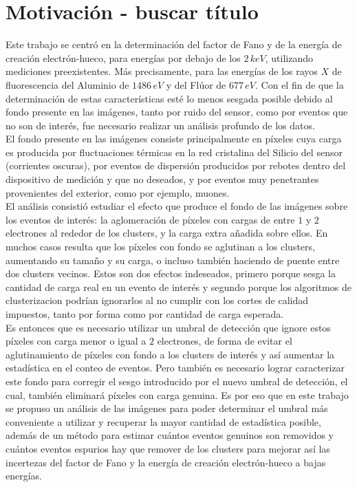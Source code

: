 \section{Motivación - buscar título}
\noindent Este trabajo se centró en la determinación del factor de Fano y de la energía de creación electrón-hueco, para energías por debajo de los $2\,\si{keV}$, utilizando mediciones preexistentes. Más precisamente, para las energías de los rayos $X$ de fluorescencia del Aluminio de $1486\,\si{eV}$ y del Flúor de $677\,\si{eV}$. Con el fin de que la determinación de estas características esté lo menos sesgada posible debido al fondo presente en las imágenes, tanto por ruido del sensor, como por eventos que no son de interés, fue necesario realizar un análisis profundo de los datos.\\
\indent El fondo presente en las imágenes consiste principalmente en píxeles cuya carga es producida por fluctuaciones térmicas en la red cristalina del Silicio del sensor (corrientes oscuras), por eventos de dispersión producidos por rebotes dentro del dispositivo de medición y que no deseados, y por eventos muy penetrantes provenientes del exterior, como por ejemplo, muones.\\
\indent El análisis consistió estudiar el efecto que produce el fondo de las imágenes sobre los eventos de interés: la aglomeración de píxeles con cargas de entre $1$ y $2$ electrones al rededor de los clusters, y la carga extra añadida sobre ellos. En muchos casos resulta que los píxeles con fondo se aglutinan a los clusters, aumentando su tamaño y su carga, o incluso también haciendo de puente entre dos clusters vecinos. Estos son dos efectos indeseados, primero porque sesga la cantidad de carga real en un evento de interés y segundo porque los algoritmos de clusterizacion podrían ignorarlos al no cumplir con los cortes de calidad impuestos, tanto por forma como por cantidad de carga esperada.\\
\indent Es entonces que es necesario utilizar un umbral de detección que ignore estos píxeles con carga menor o igual a $2$ electrones, de forma de evitar el aglutinamiento de píxeles con fondo a los clusters de interés y así aumentar la estadística en el conteo de eventos. Pero también es necesario lograr caracterizar este fondo para corregir el sesgo introducido por el nuevo umbral de detección, el cual, también eliminará píxeles con carga genuina. Es por eso que en este trabajo se propuso un análisis de las imágenes para poder determinar el umbral más conveniente a utilizar y recuperar la mayor cantidad de estadística posible, además de un método para estimar cuántos eventos genuinos son removidos y cuántos eventos espurios hay que remover de los clusters para mejorar así las incertezas del factor de Fano y la energía de creación electrón-hueco a bajas energías.

